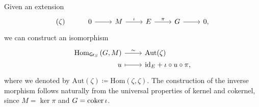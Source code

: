 \documentclass[../Main]{subfiles}
\begin{document}
\begin{rem}[]\label{rem:CorrExtAutMor}
	Given an extension
	\begin{equation*}
	\begin{tikzcd}
		(\zeta) &
		0 \arrow[r, "", rightarrow] &
		M \arrow[r, "\iota", rightarrow] &
		E \arrow[r, "\pi", rightarrow] &
		G \arrow[r, "", rightarrow] &
		0
	,\end{tikzcd}
	\end{equation*}
	we can construct an isomorphism
	\begin{equation*}
	\begin{tikzcd}[row sep = 0ex
		,/tikz/column 1/.append style={anchor=base east}
		,/tikz/column 2/.append style={anchor=base west}]
		\mathrm{Hom}_{\mathsf{Gr}_S} \left( G, M \right)
		\arrow[r, "\sim", rightarrow] &
		\mathrm{Aut}(\zeta) \\
		u \arrow[r, "", mapsto] & 
		\mathrm{id}_{ E } + \iota \circ u \circ \pi
	,\end{tikzcd}
	\end{equation*} 
	where we denoted by $\mathrm{Aut}(\zeta) \coloneqq \mathrm{Hom} \left( \zeta, \zeta \right)$.
	The construction of the inverse morphism follows naturally from the 
	universal properties of kernel and cokernel, since $M = \ker \pi$
	and $G = \operatorname{coker} \iota$.
\end{rem}
\end{document}
